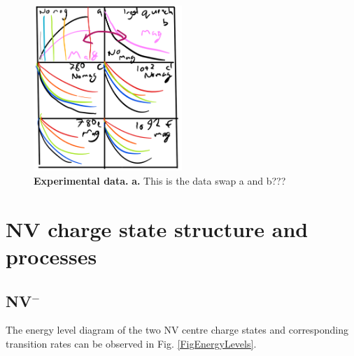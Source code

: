 \documentclass[prl]{revtex4}
\begin{document}
\begin{figure}[H]
  \centering
  \includegraphics[width=0.5\textwidth]{Data.png} 
 \caption{\textbf{Experimental data.} \textbf{a.} This is the data swap a and b???} \label{FigData}
\end{figure}


\section{NV charge state structure and processes}
\subsection{NV$^-$}
The energy level diagram of the two NV centre charge states and corresponding transition rates can be observed in Fig. \ref{FigEnergyLevels}.
\end{document}
